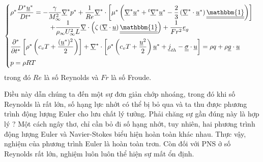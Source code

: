 \documentclass[../../../main.tex]{subfiles}
\begin{document}
\begin{description}
\[\begin{aligned}
\begin{cases}
                        \rho^*\dfrac{D^*\underline{u}^*}{Dt^*}=-\dfrac{\gamma}{M^2_\infty}\underline{\nabla}^* p^*+\dfrac{1}{Re} \underline{\nabla}^*\cdot\left[\mu^*\left(\underline{\nabla}^* \underline{u}^*+{}^t\underline{\nabla}^* \underline{u}^*-\dfrac{2}{3}\left(\underline{\nabla}^*\cdot\underline{u}^*\right) \underline{\underline{\mathbbm{1}}}\right)\right]&\\
                        \qquad\qquad\qquad+\dfrac{1}{\rho_\infty U_\infty^2L} \underline{\nabla}\cdot\left(\zeta\left(\underline{\nabla}\cdot\underline{u}\right)\underline{\underline{\mathbbm{1}}}\right)+\dfrac{1}{Fr^2}\underline{e}_g&\\[10pt]
                        \dfrac{\partial^*}{\partial t^*}\left[\rho^*\left(c_vT+\dfrac{(\underline{u}^*)^2}{2}\right)\right]+\underline{\nabla}^*\cdot\left[\rho^*\left(c_vT+\dfrac{\underline{u}^2}{2}\right)\underline{u}^*+\underline{j}_{th}-\underline{\underline{\sigma}}\cdot\underline{u}\right]=\rho q + \rho\underline{g}\cdot\underline{u}\\[10pt]
                        p = \rho RT
                    \end{cases}
                \end{aligned}
            \]
        trong đó $Re$ là số Reynolds và $Fr$ là số Froude.
        
        Điều này dẫn chúng ta đến một sự đơn giản chớp nhoáng, trong đó khi số Reynolds là rất lớn, số hạng lực nhớt có thể bị bỏ qua và ta thu được phương trình động lượng Euler cho lưu chất lý tưởng. Phải chăng sự gần đúng này là hợp lý ? Một cách ngây thơ, chỉ cần bỏ đi số hạng nhớt, tuy nhiên, hai phương trình động lượng Euler và Navier-Stokes biểu hiện hoàn toàn khác nhau. Thực vậy, nghiệm của phương trình Euler là hoàn toàn trơn. Còn đối với PNS ở số Reynolds rất lớn, nghiệm luôn luôn thể hiện sự mất ổn định.
    \end{description}
\end{document}
